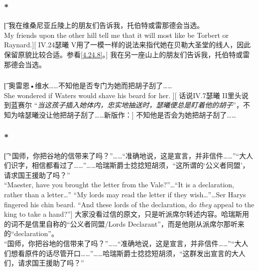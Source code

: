 \documentclass[12pt,a4paper]{article}
\begin{document}
\subsubsection{\color{red}*}\label{4.17.3}\t[
	我在维桑尼亚丘陵上的朋友们告诉我，托伯特或雷那德会当选。\\
	My friends upon the other hill tell me that it will most like be Torbert or Raynard.][
	IV.24瑟曦 V用了一模一样的说法来指代她在贝勒大圣堂的线人，因此保留原貌比较合适。参看\ref{4.24.8}。]
	我在另一座山上的朋友们告诉我，托伯特或雷那德会当选。
	
\subsubsection{}\t[
	奥雷恩•维水……不知他是否专门为她而把胡子刮了……\\
	She wondered if Waters would shave his beard for her. ][
	话说IV.7瑟曦 II里头说到蓝赛尔 “\emph{当这孩子插入她体内，忠实地抽送时，瑟曦便总是盯着他的胡子}”，不知为啥瑟曦没让他把胡子刮了……新版作：]
	不知他是否会为她把胡子刮了……
	
\subsubsection{\color{red}*}\t[
	“国师，你把谷地的信带来了吗？”……“准确地说，这是宣言，并非信件……”“大人们识字，相信都看过了……”……哈瑞斯爵士捻捻短胡须，“这所谓的‘公义者同盟’，请求国王援助了吗？”\\
	“Maester, have you brought the letter from the Vale?”\ldots“It is a declaration, rather than a letter\ldots” “My lords may read the letter if they wish\ldots”\ldots Ser Harys fingered his chin beard. “And these lords of the declaration, do \emph{they} appeal to the king to take a hand?”]\color{red}
	大家没看过信的原文，只是听派席尔转述内容。哈瑞斯用的词不是信里自称的“公义者同盟/Lords Declarant”，而是他刚从派席尔那听来的“declaration”。\color{black}\\
	“国师，你把谷地的信带来了吗？”……“准确地说，这是宣言，并非信件……”“大人们想看原件的话尽管开口……”……哈瑞斯爵士捻捻短胡须，“这群发出宣言的大人们，请求国王援助了吗？”
\end{document}
